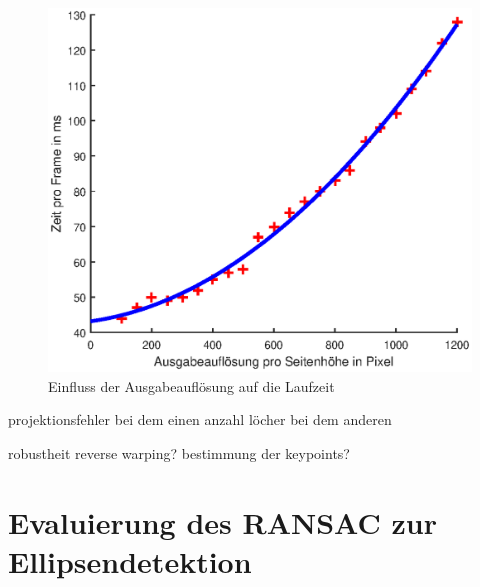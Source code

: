 \begin{figure}[!htb]
	\centering
	\includegraphics[width=\textwidth]{images/runningTimePerSlantheight.eps}
	\caption{Einfluss der Ausgabeauflösung auf die Laufzeit}
	\label{fig:influenceRes2}
\end{figure}




\bigskip\bigskip

projektionsfehler bei dem einen
anzahl löcher bei dem anderen



robustheit reverse warping? bestimmung der keypoints?







\section{Evaluierung des RANSAC zur Ellipsendetektion}



